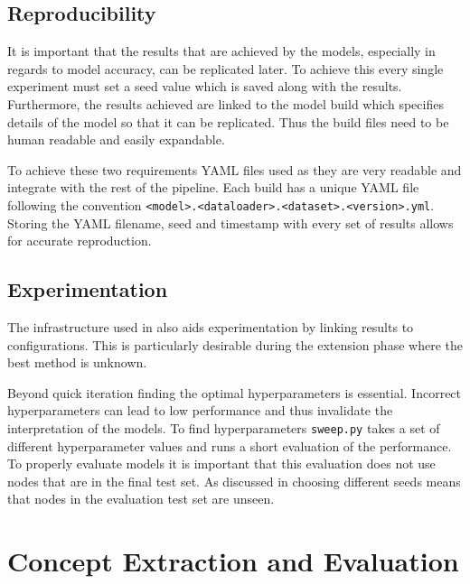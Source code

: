 \subsection{Reproducibility}
\label{sec:reproducibility}
It is important that the results that are achieved by the models, especially in regards to model accuracy, can be replicated later.
To achieve this every single experiment must set a seed value which is saved along with the results.
Furthermore, the results achieved are linked to the model build 
which specifies details of the model so that it can be replicated.
Thus the build files need to be human readable and easily expandable.

To achieve these two requirements YAML files used as they are very readable and integrate with the rest of the pipeline.
Each build has a unique YAML file following the convention \texttt{<model>.<dataloader>.<dataset>.<version>.yml}.
Storing the YAML filename, seed and timestamp with every set of results allows for accurate reproduction.

\subsection{Experimentation}
The infrastructure used in  also aids experimentation by linking results to configurations.
This is particularly desirable during the extension phase where the best method is unknown.

Beyond quick iteration finding the optimal hyperparameters is essential.
Incorrect hyperparameters can lead to low performance and thus invalidate the interpretation of the models.
To find hyperparameters \texttt{sweep.py} takes a set of different hyperparameter values and runs a short evaluation of the performance.
To properly evaluate models it is important that this evaluation does not use nodes that are in the final test set.
As discussed in  choosing different seeds means that nodes in the evaluation test set are unseen.

\section{Concept Extraction and Evaluation}
\label{sec:concepts}

